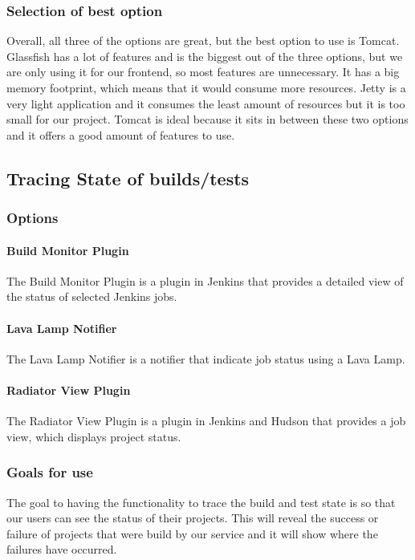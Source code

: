 \documentclass[10pt,letterpaper,onecolumn,draftclsnofoot]{IEEEtran}
\begin{document}
\subsubsection{Selection of best option}
Overall, all three of the options are great, but the best option to use is Tomcat.
Glassfish has a lot of features and is the biggest out of the three options, but we are only using it for our frontend, so most features are unnecessary.
It has a big memory footprint, which means that it would consume more resources.
Jetty is a very light application and it consumes the least amount of resources but it is too small for our project.
Tomcat is ideal because it sits in between these two options and it offers a good amount of features to use.

\subsection{Tracing State of builds/tests}
\subsubsection{Options}
\paragraph{Build Monitor Plugin}
The Build Monitor Plugin is a plugin in Jenkins that provides a detailed view of the status of selected Jenkins jobs.
\paragraph{Lava Lamp Notifier}
The Lava Lamp Notifier is a notifier that indicate job status using a Lava Lamp.
\paragraph{Radiator View Plugin}
The Radiator View Plugin is a plugin in Jenkins and Hudson that provides a job view, which displays project status.
\subsubsection{Goals for use}
The goal to having the functionality to trace the build and test state is so that our users can see the status of their projects.
This will reveal the success or failure of projects that were build by our service and it will show where the failures have occurred.
\end{document}
